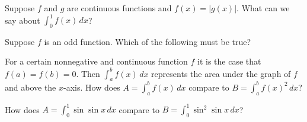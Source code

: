 \documentclass{ximera}
\newcommand{\recommendation}[1]{}
\begin{document}
\begin{problem}
  Suppose $f$ and $g$ are continuous functions and $f(x) = |g(x)|$.  What can we say about $\int_0^1 f(x) \, dx$?
  \begin{multipleChoice}
  \end{multipleChoice}
\end{problem}


\begin{problem}
  Suppose $f$ is an odd function. Which of the following must be true?
  \begin{multipleChoice}
  \end{multipleChoice}
\end{problem}




\begin{problem}
  For a certain nonnegative and continuous function $f$ it is the case
  that $f(a) = f(b) = 0$.  Then $\int_a^b f(x) \, dx$ represents the
  area under the graph of $f$ and above the $x$-axis.  How does $A = \int_a^b f(x) \, dx$ compare to $B = \int_a^b f(x)^2 \, dx$?
  \begin{multipleChoice}
  \end{multipleChoice}
\end{problem}

\begin{problem}
  How does $A = \int_0^1 \sin \sin x \, dx$ compare to $B = \int_0^1 \sin^2 \sin x \, dx$?
  \begin{multipleChoice}
  \end{multipleChoice}
\end{problem}
\end{document}
